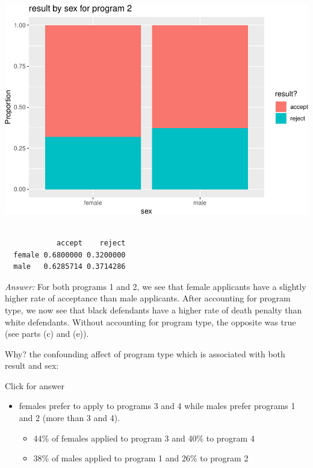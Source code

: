 \documentclass[
]{book}
\newenvironment{Shaded}{\begin{snugshade}}{\end{snugshade}}
\newcommand{\DecValTok}[1]{\textcolor[rgb]{0.00,0.00,0.81}{#1}}
\newcommand{\FunctionTok}[1]{\textcolor[rgb]{0.00,0.00,0.00}{#1}}
\newcommand{\NormalTok}[1]{#1}
\newcommand{\SpecialCharTok}[1]{\textcolor[rgb]{0.00,0.00,0.00}{#1}}
\providecommand{\tightlist}{%
  \setlength{\itemsep}{0pt}\setlength{\parskip}{0pt}}
\begin{document}
\includegraphics[width=1\linewidth]{Class_Activity_4_files/figure-latex/unnamed-chunk-31-1}

\begin{Shaded}
\end{Shaded}

\begin{verbatim}
        
            accept    reject
  female 0.6800000 0.3200000
  male   0.6285714 0.3714286
\end{verbatim}

\emph{Answer:} For both programs 1 and 2, we see that female applicants have a slightly higher rate of acceptance
than male applicants. After accounting for program type, we now see that black defendants have a higher
rate of death penalty than white defendants. Without accounting for program type, the opposite was true
(see parts (c) and (e)).

Why? the confounding affect of program type which is associated with both result and sex:

Click for answer

\begin{itemize}
\tightlist
\item
  females prefer to apply to programs 3 and 4 while males prefer programs 1 and 2 (more than 3 and
  4).

  \begin{itemize}
  \tightlist
  \item
    44\% of females applied to program 3 and 40\% to program 4
  \item
    38\% of males applied to program 1 and 26\% to program 2
  \end{itemize}
\end{itemize}
\end{document}
